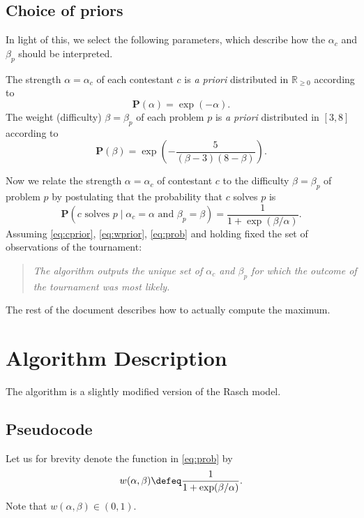 \subsection{Choice of priors}
In light of this, we select the following parameters,
which describe how the $\alpha_c$ and $\beta_p$ should be interpreted.
\begin{itemize}
	\ii The strength $\alpha = \alpha_c$ of each contestant
	$c$ is \emph{a priori} distributed in $\mathbb R_{\ge 0}$
	according to
	\begin{equation}
		\mathbf P(\alpha) = \exp(-\alpha).
		\label{eq:cprior}
	\end{equation}
	\ii The weight (difficulty) $\beta = \beta_p$ of each problem $p$ is
	\emph{a priori} distributed in $[3,8]$ according to 
	\begin{equation}
		\mathbf P(\beta) = \exp\left( -\frac{5}{(\beta-3)(8-\beta)} \right).
		\label{eq:wprior}
	\end{equation}
\end{itemize}
Now we relate the strength $\alpha = \alpha_c$ of contestant $c$
to the difficulty $\beta = \beta_p$ of problem $p$ by
postulating that the probability that $c$ solves $p$ is
\begin{equation}
	\mathbf P
	\left( \text{$c$ solves $p$} 
	\mid \alpha_c = \alpha \text{ and } \beta_p = \beta \right)
	= \frac{1}{1 + \exp(\beta/\alpha)}.
	\label{eq:prob}
\end{equation}
Assuming \eqref{eq:cprior}, \eqref{eq:wprior}, \eqref{eq:prob}
and holding fixed the set of observations of the tournament:
\begin{quote}
\itshape
The algorithm outputs the unique set of $\alpha_c$ and $\beta_p$
for which the outcome of the tournament was most likely.
\end{quote}
The rest of the document describes how to actually compute
the maximum.

\section{Algorithm Description}
The algorithm is a slightly modified version of the Rasch model.

\subsection{Pseudocode}
Let us for brevity denote the function in \eqref{eq:prob} by 
\[ w(\alpha, \beta) \defeq \frac{1}{1 + \exp(\beta/\alpha)}. \]
Note that $w(\alpha, \beta) \in (0,1)$.

